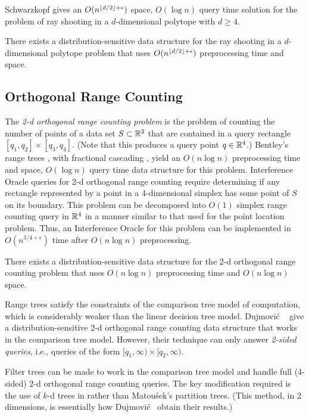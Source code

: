 \documentclass{patmorin}
\begin{document}
Schwarzkopf \cite{s92} gives an $O(n^{{\lfloor d/2 \rfloor}+\epsilon})$ space,
$O(\log n)$ query time solution for the problem of ray shooting in a
$d$-dimensional polytope with $d \ge 4$.

\begin{thm}
  There exists a distribution-sensitive data structure for the
  ray shooting in a $d$-dimensional polytope problem that uses
  $O(n^{{\lfloor d/2 \rfloor}+\epsilon})$ preprocessing time and space.
\end{thm}

\subsection{Orthogonal Range Counting}

The \emph{2-d orthogonal range counting problem} is the problem
of counting the number of points of a data set $S\subset\mathbb{R}^2$ that
are contained in a query rectangle $[q_1,q_2]\times[q_3,q_4]$. (Note
that this produces a query point $q\in \mathbb{R}^4$.) Bentley's range trees
\cite{b75}, with fractional cascading \cite{cg86,l78}, yield an $O(n\log
n)$ preprocessing time and space, $O(\log n)$ query time data structure
for this problem.  Interference Oracle queries for 2-d orthogonal
range counting require determining if any rectangle represented by a
point in a 4-dimensional simplex has some point of $S$ on its boundary.
This problem can be decomposed into $O(1)$ simplex range counting query in
$\mathbb{R}^4$ in a manner similar to that used for the point location problem.
Thus, an Interference Oracle for this problem can be implemented in
$O(n^{3/4+\epsilon})$ time after $O(n\log n)$ preprocessing.

\begin{thm}
  There exists a distribution-sensitive data structure for the 2-d
  orthogonal range counting problem that uses $O(n\log n)$ preprocessing
  time and $O(n\log n)$ space.
\end{thm}

Range trees satisfy the constraints of the comparison tree model of
computation, which is considerably weaker than the linear decision tree
model. Dujmovi\'c \etal\ \cite{dhm09} give a distribution-sensitive 2-d
orthogonal range counting data structure that works in the comparison
tree model.  However, their technique can only answer \emph{2-sided
queries}, i.e., queries of the form $[q_1,\infty)\times[q_2,\infty)$.

Filter trees can be made to work in the comparison tree model
and handle full (4-sided) 2-d orthogonal range counting queries.
The key modification required is the use of $k$-d trees in
 rather than Matou\v{s}ek's partition
trees. (This method, in 2 dimensions, is essentially how Dujmovi\'c \etal\
obtain their results.)
\end{document}
